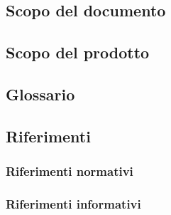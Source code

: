 


\subsection{Scopo del documento}

\subsection{Scopo del prodotto}
\scopo

\subsection{Glossario}
\presgloss

\subsection{Riferimenti} \label{sec:ref}

\subsubsection{Riferimenti normativi}

\subsubsection{Riferimenti informativi}
